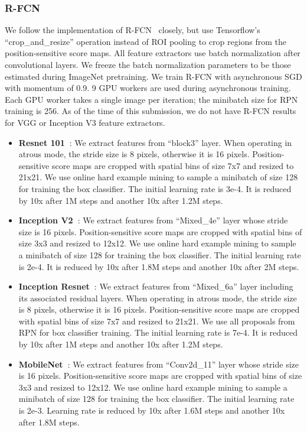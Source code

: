 \documentclass[10pt,twocolumn,letterpaper]{article}
\newcommand{\denselist}{
\itemsep -2pt\topsep-8pt\partopsep-8pt
}
\begin{document}
\subsubsection{R-FCN}
We follow the implementation of R-FCN~\cite{dai2016r} closely, but use Tensorflow's ``crop\_and\_resize'' operation instead of ROI pooling to crop regions from the position-sensitive score maps. All feature extractors use batch normalization after convolutional layers. We freeze the batch normalization parameters to be those estimated during ImageNet pretraining. 
We train R-FCN with asynchronous SGD with momentum of 0.9. 9 GPU workers are used during asynchronous training. Each GPU worker takes a single image per iteration; the minibatch size for RPN training is 256.
As of the time of this submission, we do not have R-FCN results for VGG or Inception V3
feature extractors.
\begin{itemize}\denselist
\item {\bf Resnet 101~\cite{he2015deep}}: We extract features from ``block3'' layer. When operating in atrous mode, the stride size is 8 pixels, otherwise it is 16 pixels. Position-sensitive score maps are cropped with spatial bins of size 7x7 and resized to 21x21. We use online hard example mining to sample a minibatch of size 128 for training the box classifier. The initial learning rate is 3e-4. It is reduced by 10x after 1M steps and another 10x after 1.2M steps.
\item {\bf Inception V2~\cite{ioffe2015batch}}: We extract features from ``Mixed\_4e'' layer whose stride size is 16 pixels. Position-sensitive score maps are cropped with spatial bins of size 3x3 and resized to 12x12. We use online hard example mining to sample a minibatch of size 128 for training the box classifier. The initial learning rate is 2e-4. It is reduced by 10x after 1.8M steps and another 10x after 2M steps.
\item {\bf Inception Resnet~\cite{szegedy2016inception}}: We extract features from ``Mixed\_6a'' layer including its associated residual layers. When operating in atrous mode, the stride size is 8 pixels, otherwise it is 16 pixels. Position-sensitive score maps are cropped with spatial bins of size 7x7 and resized to 21x21. We use all proposals from RPN for box classifier training. The initial learning rate is 7e-4. It is reduced by 10x after 1M steps and another 10x after 1.2M steps.
\item {\bf MobileNet~\cite{howard17}}: We extract features from ``Conv2d\_11'' layer whose stride size is 16 pixels. Position-sensitive score maps are cropped with spatial bins of size 3x3 and resized to 12x12.  We use online hard example mining to sample a minibatch of size 128 for training the box classifier. The initial learning rate is 2e-3. Learning rate is reduced by 10x after 1.6M steps and another 10x after 1.8M steps.
\end{itemize}
\end{document}
